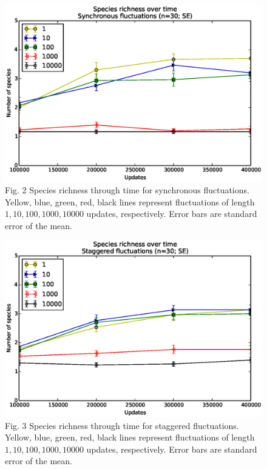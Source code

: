 \documentclass[10pt]{article}
\begin{document}
\begin{figure}[h!]
\begin{center}
\includegraphics[width=0.7\columnwidth]{figures/synchronous/synchronous.eps}
\caption{Fig. 2 Species richness through time for synchronous fluctuations. Yellow, blue, green, red, black lines represent fluctuations of length $1,10,100,1000,10000$ updates, respectively. Error bars are standard error of the mean.}
\end{center}
\end{figure}

\begin{figure}[h!]
\begin{center}
\includegraphics[width=0.7\columnwidth]{figures/staggered/staggered.eps}
\caption{Fig. 3 Species richness through time for staggered fluctuations. Yellow, blue, green, red, black lines represent fluctuations of length $1,10,100,1000,10000$ updates, respectively. Error bars are standard error of the mean.}
\end{center}
\end{figure}
\end{document}
